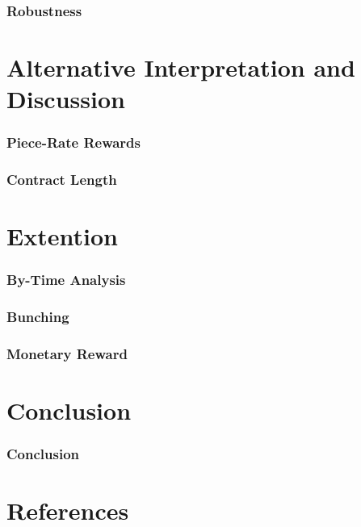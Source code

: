 \documentclass[dvipdfmx,12pt]{beamer}
\begin{document}
\begin{frame}\frametitle{Robustness}

\end{frame}

\section{Alternative Interpretation and Discussion}

\begin{frame}\frametitle{Piece-Rate Rewards}

\end{frame}

\begin{frame}\frametitle{Contract Length}

\end{frame}

\section{Extention}

\begin{frame}\frametitle{By-Time Analysis}

\end{frame}

\begin{frame}\frametitle{Bunching}

\end{frame}

\begin{frame}\frametitle{Monetary Reward}

\end{frame}

\section{Conclusion}

\begin{frame}\frametitle{Conclusion}

\end{frame}

\section*{References}
\end{document}
